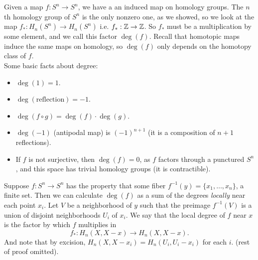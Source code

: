 \documentclass{amsart}
\begin{document}
	 \medspace
	 
	 Given a map $f:S^n\to S^n$, we have a an induced map on homology groups. The $n$th homology group of $S^n$ is the only nonzero one, as we showed, so we look at the map $f_*: H_n(S^n) \to H_n(S^n)$ i.e. $f_*:\mathbb{Z}\to \mathbb{Z}$. So $f_*$ must be a multiplication by some element, and we call this factor $\deg(f)$. Recall that homotopic maps induce the same maps on homology, so $\deg(f)$ only depends on the homotopy class of $f$.\\
	 
	 Some basic facts about degree:
	 \begin{itemize}
	 \item $\deg(1)=1$.
	 \item $\deg(\text{reflection})=-1$.
	 \item $\deg(f\circ g)=\deg(f)\cdot \deg(g)$.
	 \item $\deg(-1)$ (antipodal map) is $(-1)^{n+1}$ (it is a composition of $n+1$ reflections).
	 \item If $f$ is not surjective, then $\deg(f)=0$, as $f$ factors through a punctured $S^n$, and this space has trivial homology groups (it is contractible).
	 \end{itemize}
	 
	 \medspace
	 
	 Suppose $f:S^n\to S^n$ has the property that some fiber $f^{-1}(y) = \{x_1,\dots,x_n\}$, a finite set. Then we can calculate $\deg(f)$ as a sum of the degrees \textit{locally} near each point $x_i$. Let $V$ be a neighborhood of $y$ such that the preimage $f^{-1}(V)$ is a union of disjoint neighborhoods $U_i$ of $x_i$. We say that the local degree of $f$ near $x$ is the factor by which $f$ multiplies in
	 $$
	 f_*: H_n(X,X-x) \to H_n(X,X-x).
	 $$
	 And note that by excision, $H_n(X,X-x_i)=H_n(U_i,U_i-x_i)$ for each $i$. (rest of proof omitted).\\
	 
\end{document}

